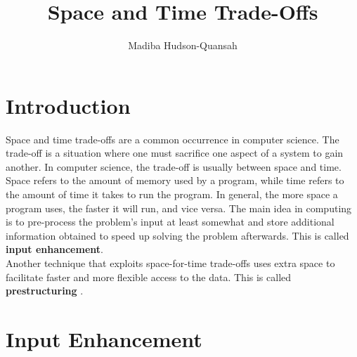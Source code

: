 \documentclass[12pt letter]{report}
\title{\Huge{Space and Time Trade-Offs}}
\author{\huge{Madiba Hudson-Quansah}}
\date{}
\begin{document}
\maketitle
\newpage
{}
\tableofcontents
\pagebreak

\chapter{Introduction}

Space and time trade-offs are a common occurrence in computer science. The trade-off is a situation where one must
sacrifice one aspect of a system to gain another. In computer science, the trade-off is usually between space and time.
Space refers to the amount of memory used by a program, while time refers to the amount of time it takes to run the
program. In general, the more space a program uses, the faster it will run, and vice versa. The main idea in computing
is to pre-process the problem's input at least somewhat and store additional information obtained to speed up solving
the problem afterwards. This is called \textbf{input enhancement}. \\
Another technique that exploits space-for-time trade-offs uses extra space to facilitate faster and more flexible access
to the data. This is called \textbf{prestructuring }. \\

\chapter{Input Enhancement}
\end{document}
